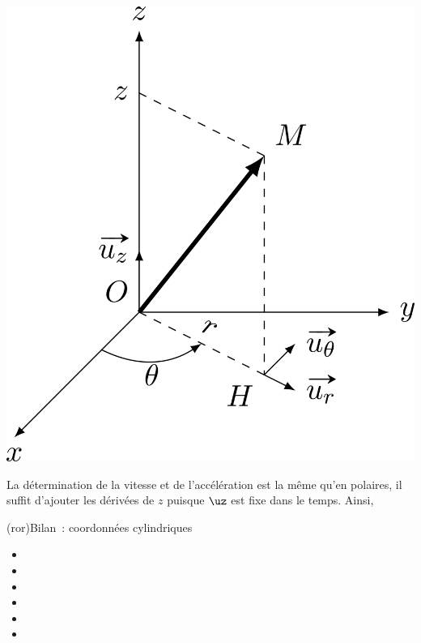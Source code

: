 \documentclass[../../main/main.tex]{subfiles}
\begin{document}
\begin{tcb*}[sidebyside, righthand ratio=.25]
\begin{center}
{\includegraphics[width=\linewidth]{cyl_rep}
			}
			\vspace{-15pt}
      \captionsetup{justification=centering}
		\end{center}
\end{tcb*}

La détermination de la vitesse et de l'accélération est la même qu'en polaires,
il suffit d'ajouter les dérivées de $z$ puisque $\uz$ est fixe dans le temps.
Ainsi,

\begin{tcb*}(ror){Bilan~: coordonnées cylindriques}
  \begin{itemize}[itemsep=-10pt]
		\item {}
      {}
		\item {}
      {\psw{$(\ur,\ut,\uz)$}}
		\item {}
      {}
		\item {}
      {}
		\item {}
      {}
		\item {}
      {}
	\end{itemize}
\end{tcb*}
\end{document}
